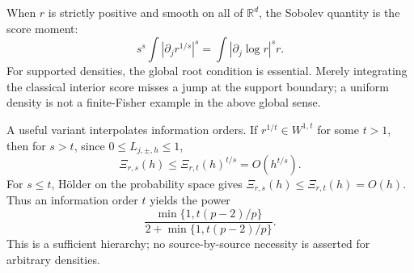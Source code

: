 \documentclass[11pt]{article}
\theoremstyle{remark}\newtheorem{remark}[theorem]{Remark}
\newcommand{\R}{\mathbb R}\newcommand{\E}{\mathbb E}
\begin{document}
When $r$ is strictly positive and smooth on all of $\R^d$, the Sobolev quantity is the score moment:
\[
 s^s\int|\partial_jr^{1/s}|^s
 =\int|\partial_j\log r|^s r.
\]
For supported densities, the global root condition is essential. Merely integrating the classical interior score misses a jump at the support boundary; a uniform density is not a finite-Fisher example in the above global sense.

A useful variant interpolates information orders. If $r^{1/t}\in W^{1,t}$ for some $t>1$, then for $s>t$, since $0\le L_{j,\pm,h}\le1$,
\[
 \Xi_{r,s}(h)\le\Xi_{r,t}(h)^{t/s}=O(h^{t/s}).
\]
For $s\le t$, H\"older on the probability space gives $\Xi_{r,s}(h)\le\Xi_{r,t}(h)=O(h)$. Thus an information order $t$ yields the power
\[
 \frac{\min\{1,t(p-2)/p\}}{2+\min\{1,t(p-2)/p\}}.
\]
This is a sufficient hierarchy; no source-by-source necessity is asserted for arbitrary densities.
\end{document}
